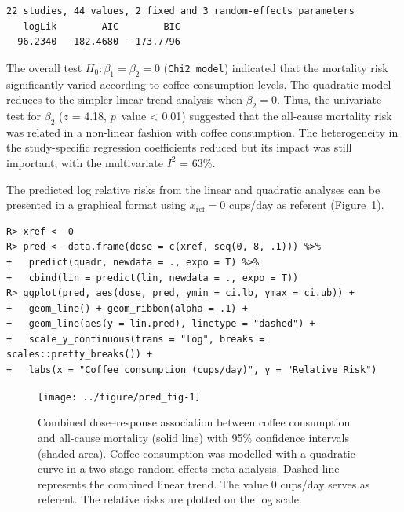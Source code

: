 \documentclass[11pt,a4paper,twoside,openany]{book}\usepackage{knitr}
\begin{document}
{\begin{knitrout}
\begin{kframe}
\begin{verbatim}
22 studies, 44 values, 2 fixed and 3 random-effects parameters
   logLik        AIC        BIC  
  96.2340  -182.4680  -173.7796  
\end{verbatim}
\end{kframe}
\end{knitrout}

\noindent The overall test $H_0: \beta_1 = \beta_2 = 0$ (\texttt{Chi2 model}) indicated that the mortality risk significantly varied according to coffee consumption levels. The quadratic model reduces to the simpler linear trend analysis when $\beta_2 = 0$. Thus, the univariate test for $\beta_2$ ($z$ = 4.18, $p$~value < 0.01) suggested that the all-cause mortality risk was related in a non-linear fashion with coffee consumption. The heterogeneity in the study-specific regression coefficients reduced but its impact was still important, with the multivariate $I^2$ = 63\%. 

The predicted log relative risks from the linear and quadratic analyses can be presented in a graphical format using $x_\mathrm{ref} = 0$ cups/day as referent (Figure~\ref{fig:pred_fig}).

\begin{knitrout}\footnotesize
{}\color{fgcolor}\begin{kframe}
\begin{verbatim}
R> xref <- 0
R> pred <- data.frame(dose = c(xref, seq(0, 8, .1))) %>%
+   predict(quadr, newdata = ., expo = T) %>%
+   cbind(lin = predict(lin, newdata = ., expo = T))
R> ggplot(pred, aes(dose, pred, ymin = ci.lb, ymax = ci.ub)) +
+   geom_line() + geom_ribbon(alpha = .1) +
+   geom_line(aes(y = lin.pred), linetype = "dashed") +
+   scale_y_continuous(trans = "log", breaks = scales::pretty_breaks()) +
+   labs(x = "Coffee consumption (cups/day)", y = "Relative Risk")
\end{verbatim}
\end{kframe}\begin{figure}[ht!]

{\centering \texttt{[image: ../figure/pred\_fig-1]} 

}

\caption[Combined dose--response association between coffee consumption and all-cause mortality (solid line) with 95\% confidence intervals (shaded area)]{Combined dose--response association between coffee consumption and all-cause mortality (solid line) with 95\% confidence intervals (shaded area). Coffee consumption was modelled with a quadratic curve in a two-stage random-effects meta-analysis. Dashed line represents the combined linear trend. The value 0 cups/day serves as referent. The relative risks are plotted on the log scale.}\label{fig:pred_fig}
\end{figure}



\end{knitrout}}
\end{document}

